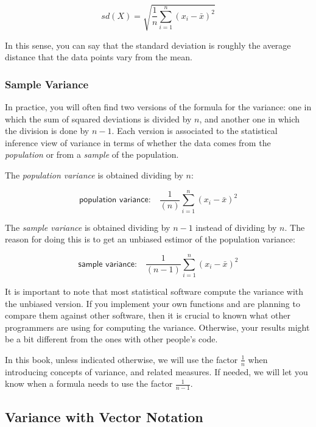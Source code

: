 \documentclass[]{book}
\begin{document}
\[
sd(X) = \sqrt{\frac{1}{n} \sum_{i=1}^{n} (x_i - \bar{x})^2}
\]

In this sense, you can say that the standard deviation is roughly the average
distance that the data points vary from the mean.

\hypertarget{sample-variance}{%
\subsubsection*{Sample Variance}\label{sample-variance}}

In practice, you will often find two versions of the formula for the variance:
one in which the sum of squared deviations is divided by \(n\), and another one
in which the division is done by \(n-1\). Each version is associated to the
statistical inference view of variance in terms of whether the data comes from
the \emph{population} or from a \emph{sample} of the population.

The \emph{population variance} is obtained dividing by \(n\):

\[
\textsf{population variance:} \quad \frac{1}{(n)} \sum_{i=1}^{n} (x_i - \bar{x})^2
\]

The \emph{sample variance} is obtained dividing by \(n - 1\) instead of dividing by \(n\).
The reason for doing this is to get an unbiased estimor of the population variance:

\[
\textsf{sample variance:} \quad \frac{1}{(n-1)} \sum_{i=1}^{n} (x_i - \bar{x})^2
\]

It is important to note that most statistical software compute the variance with
the unbiased version.
If you implement your own functions and are planning to compare them against
other software, then it is crucial to known what other programmers are using for
computing the variance. Otherwise, your results might be a bit different from
the ones with other people's code.

In this book, unless indicated otherwise, we will use the factor \(\frac{1}{n}\)
when introducing concepts of variance, and related measures. If needed, we will
let you know when a formula needs to use the factor \(\frac{1}{n-1}\).

\hypertarget{variance-with-vector-notation}{%
\subsection{Variance with Vector Notation}\label{variance-with-vector-notation}}
\end{document}
